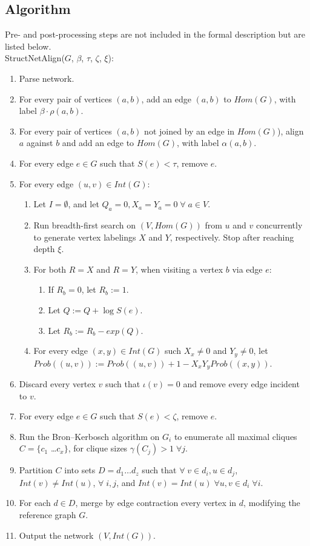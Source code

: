 \documentclass[12pt,twoside]{article}
\def\NS{
	\setlength{\itemsep}{0.1em}
	\setlength{\parskip}{0em}
	\setlength{\parsep}{0em}
}
\begin{document}
\subsection{Algorithm}

Pre- and post-processing steps are not included in the formal description but are listed below.\\
StructNetAlign($G$, $\beta$, $\tau$, $\zeta$, $\xi$):

\begin{enumerate}
\NS
\item Parse network.
\item For every pair of vertices $(a,b)$, add an edge $(a,b)$ to $Hom(G)$, with label $\beta \cdot \rho(a,b)$.
\item For every pair of vertices $(a,b)$ not joined by an edge in $Hom(G)$), align $a$ against $b$ and add an edge to $Hom(G)$, with label $\alpha(a,b)$.
\item For every edge $e \in G$ such that $S(e) < \tau$, remove $e$.
\item For every edge $(u,v) \in Int(G)$:
\begin{enumerate}
\item Let $I=\emptyset$, and let $Q_a = 0, X_a = Y_a = 0 \; \forall \; a \in V$.
\item Run breadth-first search on $(V, Hom(G))$ from $u$ and $v$ concurrently to generate vertex labelings $X$ and $Y$, respectively. Stop after reaching depth $\xi$.
\item For both $R=X$ and $R=Y$, when visiting a vertex $b$ via edge $e$:
\begin{enumerate}
\item If $R_b=0$, let $R_b := 1$.
\item Let $Q := Q + \log S(e)$.
\item Let $R_b := R_b - exp(Q)$.
\end{enumerate}
\item For every edge $(x,y) \in Int(G)$ such $X_x \neq 0$ and $Y_y \neq 0$, let $Prob((u,v)) := Prob((u,v)) + 1 - X_x Y_y Prob((x,y))$.
\end{enumerate}
\item Discard every vertex $v$ such that $\iota(v) = 0$ and remove every edge incident to $v$.
\item For every edge $e \in G$ such that $S(e) < \zeta$, remove $e$.
\item Run the Bron--Kerbosch algorithm on $G_i$ to enumerate all maximal cliques $C = \{ c_1$ \ldots $c_x \}$, for clique sizes $\gamma(C_j) > 1 \; \forall j$.
\item Partition $C$ into sets $D = d_1 \ldots d_z$ such that $\forall \; v \in d_i, u \in d_j$, $Int(v) \neq Int(u)$, $\forall \; i,j$, and $Int(v) = Int(u) \; \forall u,v \in d_i \; \forall i$.
\item For each $d \in D$, merge by edge contraction every vertex in $d$, modifying the reference graph $G$.
\item Output the network $(V, Int(G))$.
\end{enumerate}
\end{document}
